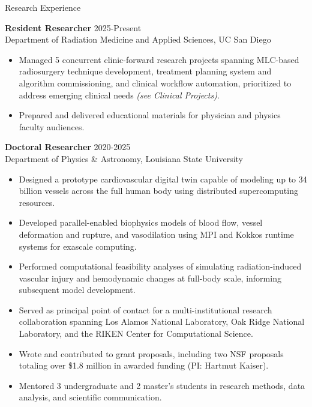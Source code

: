 \documentclass[
	11pt, %
]{resume} %
\begin{document}
\begin{rSection}{Research Experience}

	\textbf{Resident Researcher} \hfill 2025-Present \\
	Department of Radiation Medicine and Applied Sciences, UC San Diego
	\vspace{-.2cm}
	\begin{itemize}[label=$\cdot$]
		\itemsep-0.5em
		\item Managed 5 concurrent clinic-forward research projects spanning MLC-based radiosurgery technique development, treatment planning system and algorithm commissioning, and clinical workflow automation, prioritized to address emerging clinical needs \textit{(see Clinical Projects)}.
		\item Prepared and delivered educational materials for physician and physics faculty audiences.
	\end{itemize}

	\textbf{Doctoral Researcher} \hfill 2020-2025 \\
	Department of Physics \& Astronomy, Louisiana State University
	\vspace{-.2cm}
	\begin{itemize}[label=$\cdot$]
		\itemsep-0.5em
		\item Designed a prototype cardiovascular digital twin capable of modeling up to 34 billion vessels across the full human body using distributed supercomputing resources.
		\item Developed parallel-enabled biophysics models of blood flow, vessel deformation and rupture, and vasodilation using MPI and Kokkos runtime systems for exascale computing.
		\item Performed computational feasibility analyses of simulating radiation-induced vascular injury and hemodynamic changes at full-body scale, informing subsequent model development.
		\item Served as principal point of contact for a multi-institutional research collaboration spanning Los Alamos National Laboratory, Oak Ridge National Laboratory, and the RIKEN Center for Computational Science.
		\item Wrote and contributed to grant proposals, including two NSF proposals totaling over \$1.8 million in awarded funding (PI: Hartmut Kaiser).
		\item Mentored 3 undergraduate and 2 master's students in research methods, data analysis, and scientific communication.
	\end{itemize}


\end{rSection}
\end{document}
